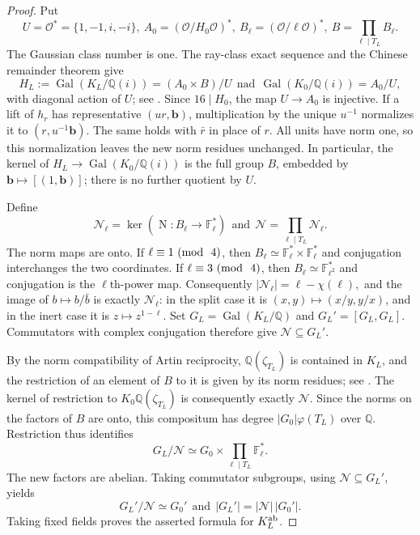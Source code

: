 \documentclass[11pt,reqno]{amsart}
\theoremstyle{definition}
\numberwithin{equation}{section}
\newcommand{\Gal}{\operatorname{Gal}}
\newcommand{\Q}{\mathbb Q}
\newcommand{\F}{\mathbb F}
\newcommand{\Nm}{\operatorname{N}}
\def\t{\text}
\def\mo{{\rm{mod}\ }}
\def\pmod#1{\ (\mo\ #1)}
\begin{document}
\begin{proof}
Put
\[
 U=\mathcal O^*=\{1,-1,i,-i\},
 \ A_0=(\mathcal O/H_0\mathcal O)^*,\ 
 B_\ell=(\mathcal O/\ell\mathcal O)^*,\ 
  B=\prod_{\ell\mid T_L}B_\ell.
\]
The Gaussian class number is one. The ray-class exact sequence and the Chinese remainder theorem give
\[
 H_L:=\Gal(K_L/\Q(i))=(A_0\times B)/U\ \ \t{nad}\ \ 
 \Gal(K_0/\Q(i))=A_0/U,
\]
with diagonal action of $U$; see \cite[Chapter V, Theorem 1.7 and Section 3]{Milne}. Since $16\mid H_0$, the map $U\to A_0$ is injective. If a lift of $h_r$ has representative $(ur,\boldsymbol b)$, multiplication by the unique $u^{-1}$ normalizes it to $(r,u^{-1}\boldsymbol b)$. The same holds with $\bar r$ in place of $r$. All units have norm one, so this normalization leaves the new norm residues unchanged. In particular, the kernel of $H_L\to\Gal(K_0/\Q(i))$ is the full group $B$, embedded by $\boldsymbol b\mapsto[(1,\boldsymbol b)]$; there is no further quotient by $U$.

Define
\[
 \mathcal N_\ell=\ker(\Nm:B_\ell\to\F_\ell^*)\ \ \t{and}\ \ 
 \mathcal N=\prod_{\ell\mid T_L}\mathcal N_\ell.
\]
The norm maps are onto. If $\ell\equiv1\pmod4$, then $B_\ell\simeq\F_\ell^*\times\F_\ell^*$ and conjugation interchanges the two coordinates. If $\ell\equiv3\pmod4$, then $B_\ell\simeq\F_{\ell^2}^*$ and conjugation is the $\ell$th-power map. Consequently
$|\mathcal N_\ell|=\ell-\chi(\ell),$
and the image of $b\mapsto b/\bar b$ is exactly $\mathcal N_\ell$: in the split case it is $(x,y)\mapsto(x/y,y/x)$, and in the inert case it is $z\mapsto z^{1-\ell}$. Set $G_L=\Gal(K_L/\Q)$ and $G_L'=[G_L,G_L]$. Commutators with complex conjugation therefore give $\mathcal N\subseteq G_L'$.

By the norm compatibility of Artin reciprocity, $\Q(\zeta_{T_L})$ is contained in $K_L$, and the restriction of an element of $B$ to it is given by its norm residues; see \cite[Chapter V, Section 3]{Milne}. The kernel of restriction to $K_0\Q(\zeta_{T_L})$ is consequently exactly $\mathcal N$. Since the norms on the factors of $B$ are onto, this compositum has degree $|G_0|\varphi(T_L)$ over $\Q$. Restriction thus identifies
\[
 G_L/\mathcal N\simeq
 G_0\times\prod_{\ell\mid T_L}\F_\ell^*.
\]
The new factors are abelian. Taking commutator subgroups, using $\mathcal N\subseteq G_L'$, yields
\[
 G_L'/\mathcal N\simeq G_0'\ \ \t{and}\ \ 
 |G_L'|=|\mathcal N|\,|G_0'|.
\]
Taking fixed fields proves the asserted formula for $K_L^{\rm ab}$.


\end{proof}
\end{document}
